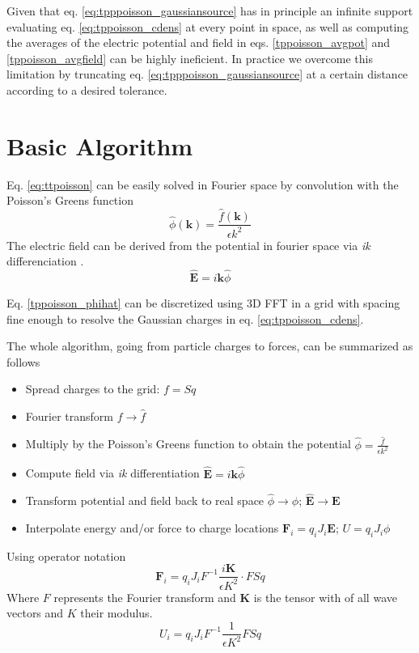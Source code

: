\documentclass[ twoside,openright,titlepage,numbers=noenddot,%
headinclude,footinclude,cleardoublepage=empty,abstract=on,
BCOR=5mm,paper=a4,fontsize=11pt, dvipsnames
]{scrreprt}
\renewcommand{\vec}[1]{\bm{#1}}
\begin{document}
Given that eq. \eqref{eq:tpppoisson_gaussiansource} has in principle an infinite support evaluating eq. \eqref{eq:tppoisson_cdens} at every point in space, as well as computing the averages of the electric potential and field in eqs. \eqref{tppoisson_avgpot} and \eqref{tppoisson_avgfield} can be highly ineficient. In practice we overcome this limitation by truncating eq. \eqref{eq:tpppoisson_gaussiansource} at a certain distance according to a desired tolerance.
\section{Basic Algorithm}
Eq. \eqref{eq:ttpoisson} can be easily solved in Fourier space by convolution with the Poisson's Greens function 
\begin{equation}
  \label{tppoisson_phihat}
 \hat\phi(\vec{k}) = \frac{\hat f(\vec{k})}{\epsilon k^2}
\end{equation}   
The electric field can be derived from the potential in fourier space via \emph{ik} differenciation \cite{ikdiff}.
\begin{equation}
  \hat{\vec{E}} = i\vec{k}\hat{\phi}
\end{equation}

Eq. \eqref{tppoisson_phihat} can be discretized using 3D \gls{FFT} in a grid with spacing fine enough to resolve the Gaussian charges in eq. \eqref{eq:tppoisson_cdens}.

The whole algorithm, going from particle charges to forces, can be summarized as follows
\begin{itemize}
\item Spread charges to the grid: $f=Sq$
\item Fourier transform $f\rightarrow \hat{f}$
\item Multiply by the Poisson's Greens function to obtain the potential $\hat{\phi}=\frac{\hat{f}}{\epsilon k^2}$
\item Compute field via \emph{ik} differentiation $\hat{\vec{E}} = i\vec{k}\hat{\phi}$
\item Transform potential and field back to real space $\hat{\phi} \rightarrow \phi$; $\hat{\vec{E}} \rightarrow \vec{E}$
\item Interpolate energy and/or force to charge locations $\vec{F}_i = q_iJ_i\vec{E}$; $U = q_iJ_i\phi$
\end{itemize}
Using operator notation
\begin{equation}
  \label{eq:tppoison_alg}
  \vec{F}_i = q_iJ_iF^{-1} \frac{i\vec{K}}{\epsilon K^2} \cdot F Sq
\end{equation}
Where $F$ represents the Fourier transform and $\vec{K}$ is the tensor with of all wave vectors and $K$ their modulus.
\begin{equation}
  \label{eq:tppoison_alg_u}
  U_i = q_iJ_iF^{-1} \frac{1}{\epsilon K^2}F Sq
\end{equation}
\end{document}
